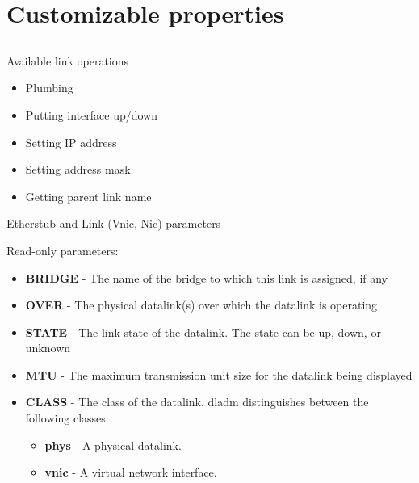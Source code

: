 \documentclass{beamer}
\begin{document}
\section{Customizable properties}

	\subsection{}

		\begin{frame}{Available link operations}

			\begin{itemize}
				\item Plumbing
				\item Putting interface up/down
				\item Setting IP address
				\item Setting address mask
				\item Getting parent link name				
			\end{itemize}
		\end{frame}


		\begin{frame}{Etherstub and Link (Vnic, Nic) parameters }

			Read-only parameters:
			
			\begin{itemize}

				\item \textbf{BRIDGE} - The name of the bridge to which this link is assigned, if any
				\item \textbf{OVER} - The physical datalink(s) over which the datalink is operating
				\item \textbf{STATE} - The link state of the datalink. The state can be up, down, or unknown
				\item \textbf{MTU} - The maximum transmission unit size for the datalink being displayed
				\item \textbf{CLASS} - The class of the datalink. dladm distinguishes between the following classes:

					\begin{itemize}
						\item \textbf{phys} - A physical datalink. 
						\item \textbf{vnic} - A virtual network interface. 				
					\end{itemize}			
			\end{itemize}

		\end{frame}
\end{document}
